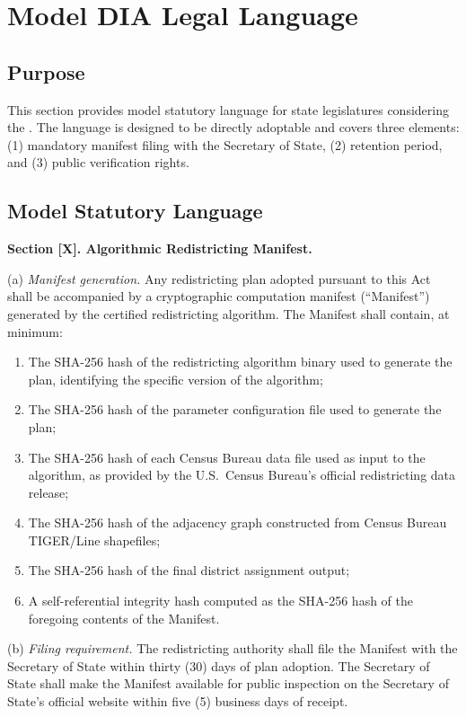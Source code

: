 \section{Model DIA Legal Language}
\label{sec:legal}

\subsection{Purpose}

This section provides model statutory language for state legislatures
considering the \dia{}.
The language is designed to be directly adoptable and covers three elements:
(1) mandatory manifest filing with the Secretary of State,
(2) retention period, and (3) public verification rights.

\subsection{Model Statutory Language}

\noindent\textbf{Section [X]. Algorithmic Redistricting Manifest.}

\medskip
(a) \textit{Manifest generation.} Any redistricting plan adopted pursuant
to this Act shall be accompanied by a cryptographic computation manifest
(``Manifest'') generated by the certified redistricting algorithm.
The Manifest shall contain, at minimum:
\begin{enumerate}
\item The SHA-256 hash of the redistricting algorithm binary used to
  generate the plan, identifying the specific version of the algorithm;
\item The SHA-256 hash of the parameter configuration file used to
  generate the plan;
\item The SHA-256 hash of each Census Bureau data file used as input
  to the algorithm, as provided by the U.S.\ Census Bureau's official
  redistricting data release;
\item The SHA-256 hash of the adjacency graph constructed from Census
  Bureau TIGER/Line shapefiles;
\item The SHA-256 hash of the final district assignment output;
\item A self-referential integrity hash computed as the SHA-256 hash
  of the foregoing contents of the Manifest.
\end{enumerate}

\medskip
(b) \textit{Filing requirement.} The redistricting authority shall file
the Manifest with the Secretary of State within thirty (30) days of plan
adoption.
The Secretary of State shall make the Manifest available for public
inspection on the Secretary of State's official website within five (5)
business days of receipt.

